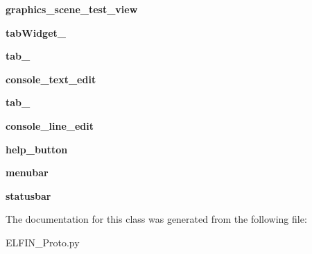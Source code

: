 \begin{DoxyCompactItemize}
\item 
\hypertarget{classELFIN__Proto_1_1Ui__MainWindow_adfe3a5daac34b752d21cc5a912d788f4}{{\bfseries graphics\-\_\-scene\-\_\-test\-\_\-view}}\label{classELFIN__Proto_1_1Ui__MainWindow_adfe3a5daac34b752d21cc5a912d788f4}

\item 
\hypertarget{classELFIN__Proto_1_1Ui__MainWindow_a83feb92c61a859bbc07e0abf160d603f}{{\bfseries tab\-Widget\-\_}}\label{classELFIN__Proto_1_1Ui__MainWindow_a83feb92c61a859bbc07e0abf160d603f}

\item 
\hypertarget{classELFIN__Proto_1_1Ui__MainWindow_a3d7e317b4e2dadbd7fef47aafbde8461}{{\bfseries tab\-\_}}\label{classELFIN__Proto_1_1Ui__MainWindow_a3d7e317b4e2dadbd7fef47aafbde8461}

\item 
\hypertarget{classELFIN__Proto_1_1Ui__MainWindow_a6d5b07b47c70b51ce4dfe4499c45d3c2}{{\bfseries console\-\_\-text\-\_\-edit}}\label{classELFIN__Proto_1_1Ui__MainWindow_a6d5b07b47c70b51ce4dfe4499c45d3c2}

\item 
\hypertarget{classELFIN__Proto_1_1Ui__MainWindow_a77e812f18b39a53fd29c688f013f34a1}{{\bfseries tab\-\_}}\label{classELFIN__Proto_1_1Ui__MainWindow_a77e812f18b39a53fd29c688f013f34a1}

\item 
\hypertarget{classELFIN__Proto_1_1Ui__MainWindow_a7c9cfbd4651b10626dca1aabea7e9c15}{{\bfseries console\-\_\-line\-\_\-edit}}\label{classELFIN__Proto_1_1Ui__MainWindow_a7c9cfbd4651b10626dca1aabea7e9c15}

\item 
\hypertarget{classELFIN__Proto_1_1Ui__MainWindow_a8a6aae86dfcf4d678781d90bccc598af}{{\bfseries help\-\_\-button}}\label{classELFIN__Proto_1_1Ui__MainWindow_a8a6aae86dfcf4d678781d90bccc598af}

\item 
\hypertarget{classELFIN__Proto_1_1Ui__MainWindow_a17a2e935787d74ffe83489acd1306eed}{{\bfseries menubar}}\label{classELFIN__Proto_1_1Ui__MainWindow_a17a2e935787d74ffe83489acd1306eed}

\item 
\hypertarget{classELFIN__Proto_1_1Ui__MainWindow_a7733e821d67dd50061f59967014ee410}{{\bfseries statusbar}}\label{classELFIN__Proto_1_1Ui__MainWindow_a7733e821d67dd50061f59967014ee410}

\end{DoxyCompactItemize}


The documentation for this class was generated from the following file\-:\begin{DoxyCompactItemize}
\item 
E\-L\-F\-I\-N\-\_\-\-Proto.\-py\end{DoxyCompactItemize}
